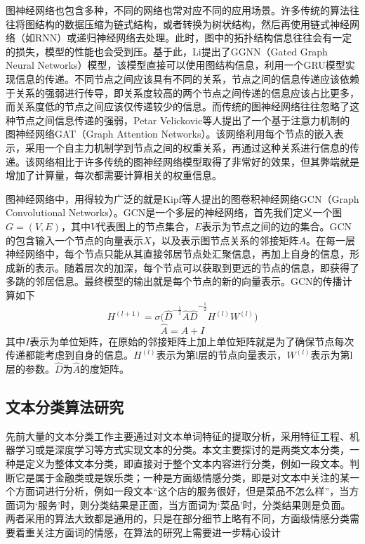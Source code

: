 图神经网络也包含多种，不同的网络也常对应不同的应用场景。许多传统的算法往往将图结构的数据压缩为链式结构，或者转换为树状结构，然后再使用链式神经网络（如RNN）或递归神经网络去处理。此时，图中的拓扑结构信息往往会有一定的损失，模型的性能也会受到压。基于此，Li提出了GGNN（Gated Graph Neural Networks）模型，该模型直接可以使用图结构信息，利用一个GRU模型实现信息的传递。不同节点之间应该具有不同的关系，节点之间的信息传递应该依赖于关系的强弱进行传导，即关系度较高的两个节点之间传递的信息应该占比更多，而关系度低的节点之间应该仅传递较少的信息。而传统的图神经网络往往忽略了这种节点之间信息传递的强弱，Petar Velickovic等人提出了一个基于注意力机制的图神经网络GAT（Graph Attention Networks）。该网络利用每个节点的嵌入表示，采用一个自主力机制学到节点之间的权重关系，再通过这种关系进行信息的传递。该网络相比于许多传统的图神经网络模型取得了非常好的效果，但其弊端就是增加了计算量，每次都需要计算相关的权重信息。

图神经网络中，用得较为广泛的就是Kipf等人提出的图卷积神经网络GCN（Graph Convolutional Networks）。GCN是一个多层的神经网络，首先我们定义一个图$G=\left(V,E\right)$，其中$V$代表图上的节点集合，$E$表示为节点之间的边的集合。GCN的包含输入一个节点的向量表示$X$，以及表示图节点关系的邻接矩阵$A$。在每一层神经网络中，每个节点只能从其直接邻居节点处汇聚信息，再加上自身的信息，形成新的表示。随着层次的加深，每个节点可以获取到更远的节点的信息，即获得了多跳的邻居信息。最终模型的输出就是每个节点的新的向量表示。GCN的传播计算如下
\begin{equation}\label{gcnFormula1}
    H^{\left(l+1\right)}=\sigma{{(\hat{D}}^{-\frac{1}{2}}\hat{A}\hat{D}}^{-\frac{1}{2}}H^{\left(l\right)}W^{\left(l\right)})
\end{equation}
\begin{equation}\label{gcnFormula2}
\hat{A}=A+I
\end{equation}
    其中$I$表示为单位矩阵，在原始的邻接矩阵上加上单位矩阵就是为了确保节点每次传递都能考虑到自身的信息。$H^{\left(l\right)}$表示为第l层的节点向量表示，$W^{\left(l\right)}$表示为第l层的参数。$\hat{D}$为$\hat{A}$的度矩阵。

\subsection{文本分类算法研究}
先前大量的文本分类工作主要通过对文本单词特征的提取分析，采用特征工程、机器学习或是深度学习等方式实现文本的分类。本文主要探讨的是两类文本分类，一种是定义为整体文本分类，即直接对于整个文本内容进行分类，例如一段文本。判断它是属于金融类或是娱乐类；一种是方面级情感分类，即是对文本中关注的某一个方面词进行分析，例如一段文本“这个店的服务很好，但是菜品不怎么样”，当方面词为‘服务’时，则分类结果是正面，当方面词为‘菜品’时，分类结果则是负面。两者采用的算法大致都是通用的，只是在部分细节上略有不同，方面级情感分类需要着重关注方面词的情感，在算法的研究上需要进一步精心设计

